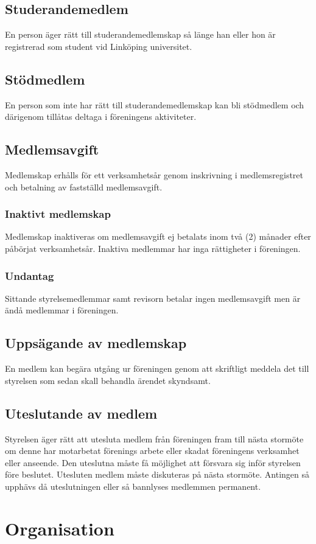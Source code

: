 \documentclass[11pt,a4paper]{article}
\begin{document}
\subsection{Studerandemedlem}
En person äger rätt till studerandemedlemskap så länge han eller hon är registrerad som student vid Linköping universitet.
\subsection{Stödmedlem}
En person som inte har rätt till studerandemedlemskap kan bli stödmedlem och därigenom tillåtas deltaga i föreningens aktiviteter.

\subsection{Medlemsavgift}
Medlemskap erhålls för ett verksamhetsår genom inskrivning i medlemsregistret och betalning av fastställd medlemsavgift.
\subsubsection{Inaktivt medlemskap}
Medlemskap inaktiveras om medlemsavgift ej betalats inom två (2) månader efter påbörjat verksamhetsår. Inaktiva medlemmar har inga rättigheter i föreningen.
\subsubsection{Undantag}
Sittande styrelsemedlemmar samt revisorn betalar ingen medlemsavgift men är ändå medlemmar i föreningen.
\subsection{Uppsägande av medlemskap}
En medlem kan begära utgång ur föreningen genom att skriftligt meddela det till styrelsen som sedan skall behandla ärendet skyndsamt.
\subsection{Uteslutande av medlem}
Styrelsen äger rätt att utesluta medlem från föreningen fram till nästa
stormöte om denne har motarbetat förenings arbete eller skadat föreningens verksamhet eller anseende. Den uteslutna måste få möjlighet att försvara sig inför styrelsen före beslutet. Utesluten medlem måste diskuteras på nästa stormöte. Antingen så upphävs då uteslutningen eller så bannlyses medlemmen permanent.

\section{Organisation}
\end{document}
